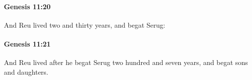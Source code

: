 		\paragraph{Genesis 11:20} %
			\label{GENESIS-11-20}

			And Reu lived two and thirty years, and begat Serug:


		\paragraph{Genesis 11:21} %
			\label{GENESIS-11-21}

			And Reu lived after he begat Serug two hundred and seven years, and begat sons and daughters.


